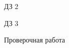 \begin{homework}[number=1]
\begin{listofex}
	\end{listofex}
\end{homework}

\begin{homework}[number=2]
	\begin{listofex}
		\item ДЗ 2
	\end{listofex}
\end{homework}

\begin{homework}[number=3]
	\begin{listofex}
		\item ДЗ 3
	\end{listofex}
\end{homework}

\begin{exam}
	\begin{listofex}
		\item Проверочная работа
	\end{listofex}
\end{exam}
